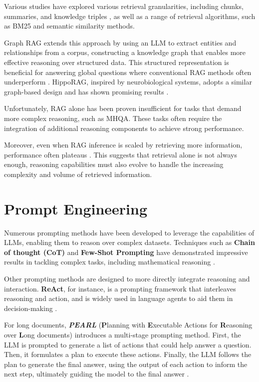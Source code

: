 \noindent Various studies have explored various retrieval granularities, including chunks, summaries, and knowledge triples \cite{zeng2024structuralmemoryllmagents}, as well as a range of retrieval algorithms, such as BM25 and semantic similarity methods.

\noindent Graph RAG extends this approach by using an LLM to extract entities and relationships from a corpus, constructing a knowledge graph that enables more effective reasoning over structured data. This structured representation is beneficial for answering global questions where conventional RAG methods often underperform \cite{edge2024localglobalgraphrag}. HippoRAG, inspired by neurobiological systems, adopts a similar graph-based design and has shown promising results \cite{NEURIPS2024_6ddc001d}.

\noindent Unfortunately, RAG alone has been proven insufficient for  tasks that demand more complex reasoning, such as MHQA. These tasks often require the integration of additional reasoning components to achieve strong performance.

\noindent Moreover, even when RAG inference is scaled by retrieving more information, performance often plateaus \cite{leng2024longcontextragperformance}. This suggests that retrieval alone is not always enough, reasoning capabilities must also evolve to handle the increasing complexity and volume of retrieved information.

\section{Prompt Engineering}

Numerous prompting methods have been developed to leverage the capabilities of LLMs, enabling them to reason over complex datasets. Techniques such as \textbf{Chain of thought (CoT)} and \textbf{Few-Shot Prompting} have demonstrated impressive results in tackling complex tasks, including mathematical reasoning \cite{wei2023chainofthoughtpromptingelicitsreasoning}.

\noindent Other prompting methods are designed to more directly integrate reasoning and interaction. \textbf{ReAct}, for instance, is a prompting framework that interleaves reasoning and action, and is widely used in language agents to aid them in decision-making \cite{yao2023react}\cite{language-agent-tutorial}.

\noindent For long documents, \textit{\textbf{PEARL}} (\textbf{P}lanning with \textbf{E}xecutable Actions for \textbf{R}easoning over \textbf{L}ong documents) introduces a multi-stage prompting method. First, the LLM is prompted to generate a list of actions that could help answer a question. Then, it formulates a plan to execute these actions. Finally, the LLM follows the plan to generate the final answer, using the output of each action to inform the next step, ultimately guiding the model to the final answer \cite{sun-etal-2024-pearl}. 

